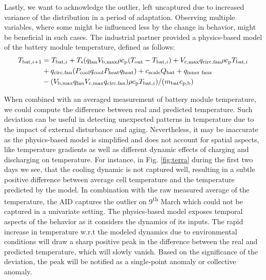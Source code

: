 Lastly, we want to acknowledge the outlier, left uncaptured due to increased variance of the distribution in a period of adaptation. Observing multiple variables, where some might be influenced less by the change in behavior, might be beneficial in such cases. The industrial partner provided a physics-based model of the battery module temperature, defined as follows:
\begin{align}
 T _{\text{bat}, i+1} &= T _{\text{bat}, i} + T _{\text{s}} (q _{\text{fan}} V _{\text{b,max}} \rho c _{\text{p}} (T _{\text{out}} - T _{\text{bat}, i}) + V _{\text{c,max}}q _{\text{circ.fan}} \rho c _{\text{p}} T _{\text{bat}, i} \nonumber \\
 &+ q _{\text{circ.fan}} (P _{\text{cool}} q _{\text{cool}} P _{\text{heat}} q _{\text{heat}}) + c _{\text{scale}} Q _{\text{bat}} + q _{\text{inner fans}} \\
 &- (V _{\text{b,max}} q _{\text{fan}} V _{\text{c,max}} q _{\text{circ.fan}}) \rho c _{\text{p}} T _{\text{bat}, i}) / (m _{\text{bat}} c _{\text{p,b}}) \text{}\nonumber
\end{align}

When combined with an averaged measurement of battery module temperature, we could compute the difference between real and predicted temperature. Such deviation can be useful in detecting unexpected patterns in temperature due to the impact of external disturbance and aging. Nevertheless, it may be inaccurate as the physics-based model is simplified and does not account for spatial aspects, like temperature gradients as well as different dynamic effects of charging and discharging on temperature. For instance, in Fig. \ref{fig:terra} during the first two days we see, that the cooling dynamic is not captured well, resulting in a subtle positive difference between average cell temperature and the temperature predicted by the model. In combination with the raw measured average of the temperature, the AID captures the outlier on 9\textsuperscript{th} March which could not be captured in a univariate setting. The physics-based model exposes temporal aspects of the behavior as it considers the dynamics of its inputs. The rapid increase in temperature w.r.t the modeled dynamics due to environmental conditions will draw a sharp positive peak in the difference between the real and predicted temperature, which will slowly vanish. Based on the significance of the deviation, the peak will be notified as a single-point anomaly or collective anomaly.

